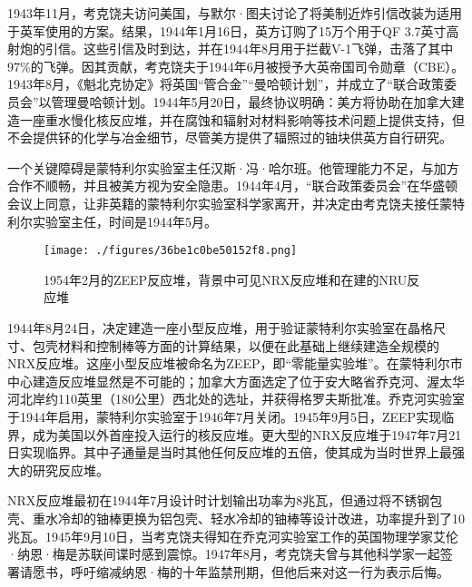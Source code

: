 1943年11月，考克饶夫访问美国，与默尔·图夫讨论了将美制近炸引信改装为适用于英军使用的方案。结果，1944年1月16日，英方订购了15万个用于QF 3.7英寸高射炮的引信。这些引信及时到达，并在1944年8月用于拦截V-1飞弹，击落了其中97\%的飞弹。因其贡献，考克饶夫于1944年6月被授予大英帝国司令勋章（CBE）。1943年8月，《魁北克协定》将英国“管合金”“曼哈顿计划”，并成立了“联合政策委员会”以管理曼哈顿计划。1944年5月20日，最终协议明确：美方将协助在加拿大建造一座重水慢化核反应堆，并在腐蚀和辐射对材料影响等技术问题上提供支持，但不会提供钚的化学与冶金细节，尽管美方提供了辐照过的铀块供英方自行研究。

一个关键障碍是蒙特利尔实验室主任汉斯·冯·哈尔班。他管理能力不足，与加方合作不顺畅，并且被美方视为安全隐患。1944年4月，“联合政策委员会”在华盛顿会议上同意，让非英籍的蒙特利尔实验室科学家离开，并决定由考克饶夫接任蒙特利尔实验室主任，时间是1944年5月。
\begin{figure}[ht]
\centering
\texttt{[image: ./figures/36be1c0be50152f8.png]}
\caption{1954年2月的ZEEP反应堆，背景中可见NRX反应堆和在建的NRU反应堆} \label{fig_YHkrf_6}
\end{figure}
1944年8月24日，决定建造一座小型反应堆，用于验证蒙特利尔实验室在晶格尺寸、包壳材料和控制棒等方面的计算结果，以便在此基础上继续建造全规模的NRX反应堆。这座小型反应堆被命名为ZEEP，即“零能量实验堆”。在蒙特利尔市中心建造反应堆显然是不可能的；加拿大方面选定了位于安大略省乔克河、渥太华河北岸约110英里（180公里）西北处的选址，并获得格罗夫斯批准。乔克河实验室于1944年启用，蒙特利尔实验室于1946年7月关闭。1945年9月5日，ZEEP实现临界，成为美国以外首座投入运行的核反应堆。更大型的NRX反应堆于1947年7月21日实现临界。其中子通量是当时其他任何反应堆的五倍，使其成为当时世界上最强大的研究反应堆。

NRX反应堆最初在1944年7月设计时计划输出功率为8兆瓦，但通过将不锈钢包壳、重水冷却的铀棒更换为铝包壳、轻水冷却的铀棒等设计改进，功率提升到了10兆瓦。1945年9月10日，当考克饶夫得知在乔克河实验室工作的英国物理学家艾伦·纳恩·梅是苏联间谍时感到震惊。1947年8月，考克饶夫曾与其他科学家一起签署请愿书，呼吁缩减纳恩·梅的十年监禁刑期，但他后来对这一行为表示后悔。